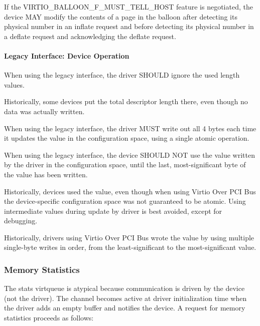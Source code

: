 If the VIRTIO_BALLOON_F_MUST_TELL_HOST feature is negotiated, the
device MAY modify the contents of a page in the balloon
after detecting its physical number in an inflate request
and before detecting its physical number in a deflate request
and acknowledging the deflate request.

\paragraph{Legacy Interface: Device Operation}\label{sec:Device
Types / Memory Balloon Device / Device Operation / Legacy
Interface: Device Operation}
When using the legacy interface, the driver SHOULD ignore the
used length values.
\begin{note}
Historically, some devices put the total descriptor length there,
even though no data was actually written.
\end{note}
When using the legacy interface, the driver MUST write out all
4 bytes each time it updates the  value in the
configuration space, using a single atomic operation.

When using the legacy interface, the device SHOULD NOT use the
 value written by the driver in the configuration
space, until the last, most-significant byte of the value has been
written.
\begin{note}
Historically, devices used the  value, even though
when using Virtio Over PCI Bus the device-specific configuration
space was not guaranteed to be atomic. Using intermediate
values during update by driver is best avoided, except for
debugging.

Historically, drivers using Virtio Over PCI Bus wrote the
 value by using multiple single-byte writes in
order, from the least-significant to the most-significant value.
\end{note}
\subsubsection{Memory Statistics}\label{sec:Device Types / Memory Balloon Device / Device Operation / Memory Statistics}

The stats virtqueue is atypical because communication is driven
by the device (not the driver). The channel becomes active at
driver initialization time when the driver adds an empty buffer
and notifies the device. A request for memory statistics proceeds
as follows:

